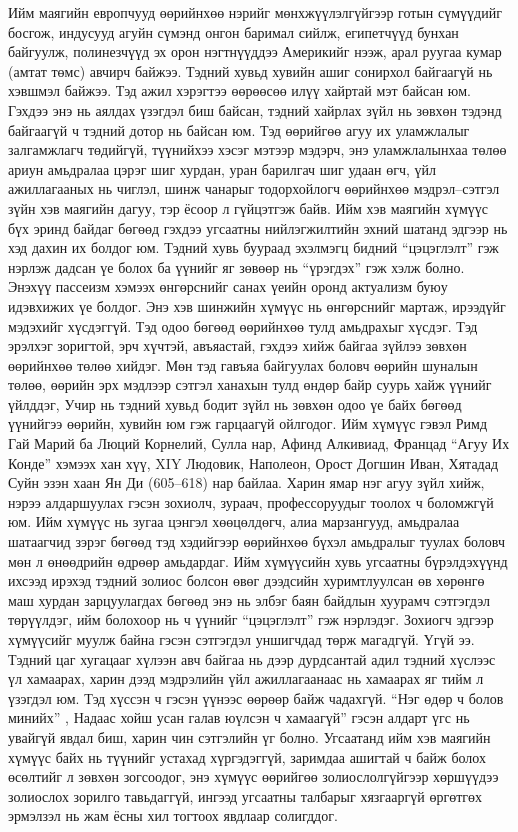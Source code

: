 Ийм маягийн европчууд өөрийнхөө нэрийг мөнхжүүлэлгүйгээр готын сүмүүдийг босгож, индусууд агуйн сүмэнд онгон баримал сийлж, египетчүүд бунхан байгуулж, полинезчүүд эх орон нэгтнүүддээ Америкийг нээж, арал руугаа кумар (амтат төмс) авчирч байжээ. Тэдний хувьд хувийн ашиг сонирхол байгаагүй нь хэвшмэл байжээ. Тэд ажил хэрэгтээ өөрөөсөө илүү хайртай мэт байсан юм. Гэхдээ энэ нь аялдах үзэгдэл биш байсан, тэдний хайрлах зүйл нь зөвхөн тэдэнд байгаагүй ч тэдний дотор нь байсан юм. Тэд өөрийгөө агуу их уламжлалыг залгамжлагч төдийгүй, түүнийхээ хэсэг мэтээр мэдэрч, энэ уламжлалынхаа төлөө ариун амьдралаа цэрэг шиг хурдан, уран барилгач шиг удаан өгч, үйл ажиллагааных нь чиглэл, шинж чанарыг тодорхойлогч өөрийнхөө мэдрэл–сэтгэл зүйн хэв маягийн дагуу, тэр ёсоор л гүйцэтгэж байв. Ийм хэв маягийн хүмүүс бүх эринд байдаг бөгөөд гэхдээ угсаатны нийлэгжилтийн эхний шатанд эдгээр нь хэд дахин их болдог юм. Тэдний хувь буураад эхэлмэгц бидний “цэцэглэлт” гэж нэрлэж дадсан үе болох ба үүнийг яг зөвөөр нь “үрэгдэх” гэж хэлж болно.
Энэхүү пассеизм хэмээх өнгөрснийг санах үеийн оронд актуализм буюу идэвхижих үе болдог. Энэ хэв шинжийн хүмүүс нь өнгөрснийг мартаж, ирээдүйг мэдэхийг хүсдэггүй. Тэд одоо бөгөөд өөрийнхөө тулд амьдрахыг хүсдэг. Тэд эрэлхэг зоригтой, эрч хүчтэй, авъяастай, гэхдээ хийж байгаа зүйлээ зөвхөн өөрийнхөө төлөө хийдэг. Мөн тэд гавъяа байгуулах боловч өөрийн шуналын төлөө, өөрийн эрх мэдлээр сэтгэл ханахын тулд өндөр байр суурь хайж үүнийг үйлддэг, Учир нь тэдний хувьд бодит зүйл нь зөвхөн одоо үе байх бөгөөд үүнийгээ өөрийн, хувийн юм гэж гарцаагүй ойлгодог. Ийм хүмүүс гэвэл Римд Гай Марий ба Люций Корнелий, Сулла нар, Афинд Алкивиад, Францад “Агуу Их Конде” хэмээх хан хүү, XIY Людовик, Наполеон, Орост Догшин Иван, Хятадад Суйн эзэн хаан Ян Ди (605–618) нар байлаа. Харин ямар нэг агуу зүйл хийж, нэрээ алдаршуулах гэсэн зохиолч, зураач, профессоруудыг тоолох ч боломжгүй юм. Ийм хүмүүс нь зугаа цэнгэл хөөцөлдөгч, алиа марзангууд, амьдралаа шатаагчид зэрэг бөгөөд тэд хэдийгээр өөрийнхөө бүхэл амьдралыг туулах боловч мөн л өнөөдрийн өдрөөр амьдардаг. Ийм хүмүүсийн хувь угсаатны бүрэлдэхүүнд ихсээд ирэхэд тэдний золиос болсон өвөг дээдсийн хуримтлуулсан өв хөрөнгө маш хурдан зарцуулагдах бөгөөд энэ нь элбэг баян байдлын хуурамч сэтгэгдэл төрүүлдэг, ийм болохоор нь ч үүнийг “цэцэглэлт” гэж нэрлэдэг.
Зохиогч эдгээр хүмүүсийг муулж байна гэсэн сэтгэгдэл уншигчдад төрж магадгүй. Үгүй ээ. Тэдний цаг хугацааг хүлээн авч байгаа нь дээр дурдсантай адил тэдний хүслээс үл хамаарах, харин дээд мэдрэлийн үйл ажиллагаанаас нь хамаарах яг тийм л үзэгдэл юм. Тэд хүссэн ч гэсэн үүнээс өөрөөр байж чадахгүй. “Нэг өдөр ч болов минийх” , Надаас хойш усан галав юүлсэн ч хамаагүй” гэсэн алдарт үгс нь увайгүй явдал биш, харин чин сэтгэлийн үг болно. Угсаатанд ийм хэв маягийн хүмүүс байх нь түүнийг устахад хүргэдэггүй, заримдаа ашигтай ч байж болох өсөлтийг л зөвхөн зогсоодог, энэ хүмүүс өөрийгөө золиослолгүйгээр хөршүүдээ золиослох зорилго тавьдаггүй, ингээд угсаатны талбарыг хязгааргүй өргөтгөх эрмэлзэл нь жам ёсны хил тогтоох явдлаар солигддог.

